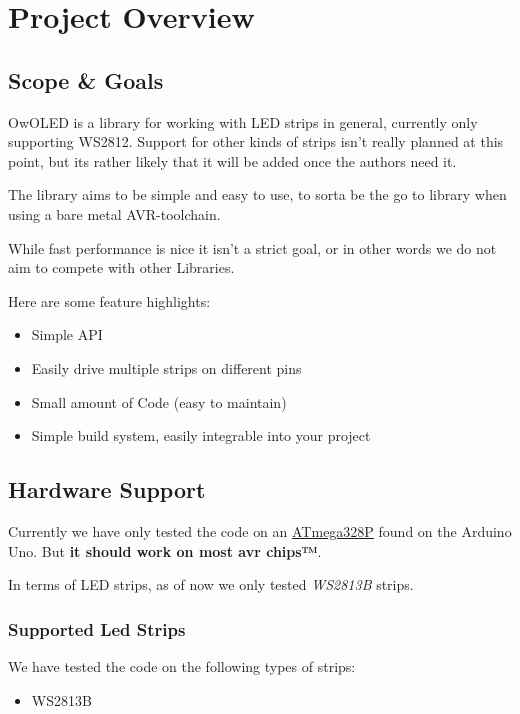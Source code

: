\section{Project Overview}

\subsection{Scope \& Goals}
OwOLED is a library for working with LED strips in general, currently only supporting WS2812. Support for other kinds of strips isn't really planned at this point, but its rather likely that it will be added once the authors need it.

\bigskip
The library aims to be simple and easy to use, to sorta be the go to library when using a bare metal AVR-toolchain.

\bigskip
While fast performance is nice it isn't a strict goal, or in other words we do not aim to compete with other Libraries.

\bigskip
Here are some feature highlights:

\begin{itemize}
    \item Simple API
    \item Easily drive multiple strips on different pins
    \item Small amount of Code (easy to maintain)
    \item Simple build system, easily integrable into your project 
\end{itemize}

\subsection{Hardware Support}
Currently we have only tested the code on an \href{https://www.microchip.com/wwwproducts/en/ATMEGA328P}{ATmega328P} found on the Arduino Uno. But \textbf{it should work on most avr chips™}.

In terms of LED strips, as of now we only tested \textit{WS2813B} strips.

\subsubsection{Supported Led Strips}
We have tested the code on the following types of strips:
\begin{itemize}
    \item WS2813B
\end{itemize}

